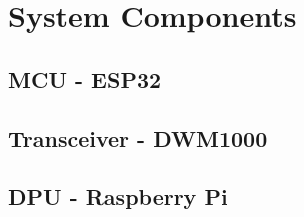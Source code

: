 

\setcounter{section}{2}
\section{System Components}
\bigskip

\subsection{MCU - ESP32}


\pagebreak
\subsection{Transceiver - DWM1000} 


\pagebreak
\subsection{DPU - Raspberry Pi}